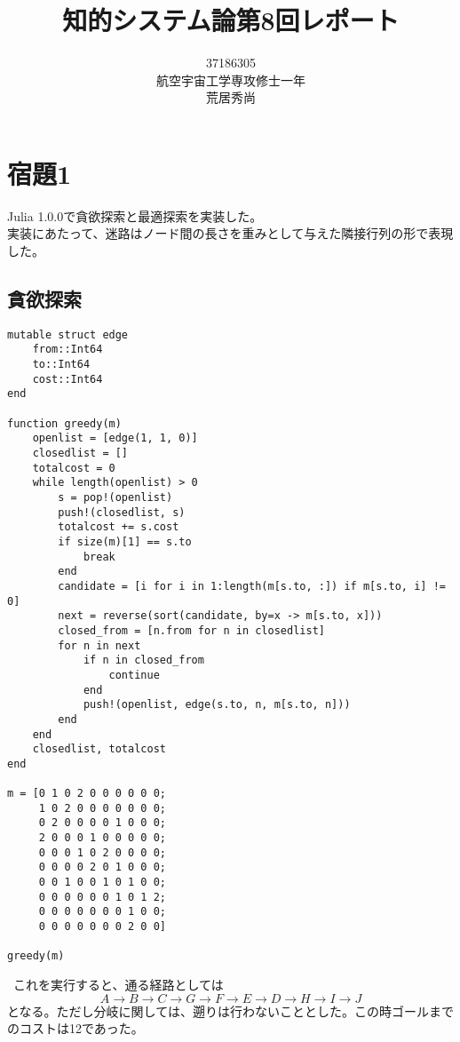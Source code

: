 \documentclass[10pt,a4paper]{ltjsarticle}       %
\title{知的システム論第8回レポート}
\author{37186305\\航空宇宙工学専攻修士一年\\荒居秀尚}
\begin{document}
\maketitle
\section{宿題1}
Julia 1.0.0で貪欲探索と最適探索を実装した。\\
実装にあたって、迷路はノード間の長さを重みとして与えた隣接行列の形で表現した。
\subsection{貪欲探索}
\begin{lstlisting}
mutable struct edge
    from::Int64
    to::Int64
    cost::Int64
end

function greedy(m)
    openlist = [edge(1, 1, 0)]
    closedlist = []
    totalcost = 0
    while length(openlist) > 0
        s = pop!(openlist)
        push!(closedlist, s)
        totalcost += s.cost
        if size(m)[1] == s.to
            break
        end
        candidate = [i for i in 1:length(m[s.to, :]) if m[s.to, i] != 0]
        next = reverse(sort(candidate, by=x -> m[s.to, x]))
        closed_from = [n.from for n in closedlist]
        for n in next
            if n in closed_from
                continue
            end
            push!(openlist, edge(s.to, n, m[s.to, n]))
        end
    end
    closedlist, totalcost
end

m = [0 1 0 2 0 0 0 0 0 0;
     1 0 2 0 0 0 0 0 0 0;
     0 2 0 0 0 0 1 0 0 0;
     2 0 0 0 1 0 0 0 0 0;
     0 0 0 1 0 2 0 0 0 0;
     0 0 0 0 2 0 1 0 0 0;
     0 0 1 0 0 1 0 1 0 0;
     0 0 0 0 0 0 1 0 1 2;
     0 0 0 0 0 0 0 1 0 0;
     0 0 0 0 0 0 0 2 0 0]

greedy(m)
\end{lstlisting}
 これを実行すると、通る経路としては
\begin{equation*}
A \rightarrow B \rightarrow C \rightarrow G \rightarrow F \rightarrow E \rightarrow D \rightarrow H \rightarrow I \rightarrow J
\end{equation*}
となる。ただし分岐に関しては、遡りは行わないこととした。この時ゴールまでのコストは12であった。
\end{document}

